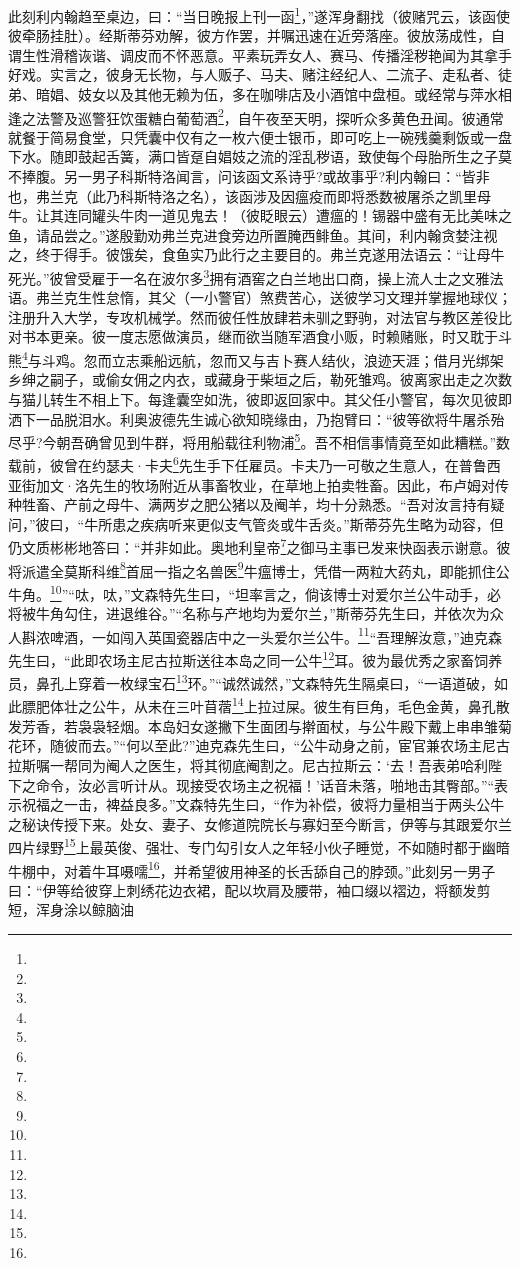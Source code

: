 \par 此刻利内翰趋至桌边，曰：“当日晚报上刊一函\footnote{}，”遂浑身翻找（彼赌咒云，该函使彼牵肠挂肚）。经斯蒂芬劝解，彼方作罢，并嘱迅速在近旁落座。彼放荡成性，自谓生性滑稽诙谐、调皮而不怀恶意。平素玩弄女人、赛马、传播淫秽艳闻为其拿手好戏。实言之，彼身无长物，与人贩子、马夫、赌注经纪人、二流子、走私者、徒弟、暗娼、妓女以及其他无赖为伍，多在咖啡店及小酒馆中盘桓。或经常与萍水相逢之法警及巡警狂饮蛋糖白葡萄酒\footnote{}，自午夜至天明，探听众多黄色丑闻。彼通常就餐于简易食堂，只凭囊中仅有之一枚六便士银币，即可吃上一碗残羹剩饭或一盘下水。随即鼓起舌簧，满口皆趸自娼妓之流的淫乱秽语，致使每个母胎所生之子莫不捧腹。另一男子科斯特洛闻言，问该函文系诗乎?或故事乎?利内翰曰：“皆非也，弗兰克（此乃科斯特洛之名），该函涉及因瘟疫而即将悉数被屠杀之凯里母牛。让其连同罐头牛肉一道见鬼去！（彼眨眼云）遭瘟的！锡器中盛有无比美味之鱼，请品尝之。”遂殷勤劝弗兰克进食旁边所置腌西鲱鱼。其间，利内翰贪婪注视之，终于得手。彼饿矣，食鱼实乃此行之主要目的。弗兰克遂用法语云：“让母牛死光。”彼曾受雇于一名在波尔多\footnote{}拥有酒窖之白兰地出口商，操上流人士之文雅法语。弗兰克生性怠惰，其父（一小警官）煞费苦心，送彼学习文理并掌握地球仪；注册升入大学，专攻机械学。然而彼任性放肆若未驯之野驹，对法官与教区差役比对书本更亲。彼一度志愿做演员，继而欲当随军酒食小贩，时赖赌账，时又耽于斗熊\footnote{}与斗鸡。忽而立志乘船远航，忽而又与吉卜赛人结伙，浪迹天涯；借月光绑架乡绅之嗣子，或偷女佣之内衣，或藏身于柴垣之后，勒死雏鸡。彼离家出走之次数与猫儿转生不相上下。每逢囊空如洗，彼即返回家中。其父任小警官，每次见彼即洒下一品脱泪水。利奥波德先生诚心欲知晓缘由，乃抱臂曰：“彼等欲将牛屠杀殆尽乎?今朝吾确曾见到牛群，将用船载往利物浦\footnote{}。吾不相信事情竟至如此糟糕。”数载前，彼曾在约瑟夫·卡夫\footnote{}先生手下任雇员。卡夫乃一可敬之生意人，在普鲁西亚街加文·洛先生的牧场附近从事畜牧业，在草地上拍卖牲畜。因此，布卢姆对传种牲畜、产前之母牛、满两岁之肥公猪以及阉羊，均十分熟悉。“吾对汝言持有疑问，”彼曰，“牛所患之疾病听来更似支气管炎或牛舌炎。”斯蒂芬先生略为动容，但仍文质彬彬地答曰：“并非如此。奥地利皇帝\footnote{}之御马主事已发来快函表示谢意。彼将派遣全莫斯科维\footnote{}首屈一指之名兽医\footnote{}牛瘟博士，凭借一两粒大药丸，即能抓住公牛角。\footnote{}”“呔，呔，”文森特先生曰，“坦率言之，倘该博士对爱尔兰公牛动手，必将被牛角勾住，进退维谷。”“名称与产地均为爱尔兰，”斯蒂芬先生曰，并依次为众人斟浓啤酒，一如闯入英国瓷器店中之一头爱尔兰公牛。\footnote{}“吾理解汝意，”迪克森先生曰，“此即农场主尼古拉斯送往本岛之同一公牛\footnote{}耳。彼为最优秀之家畜饲养员，鼻孔上穿着一枚绿宝石\footnote{}环。”“诚然诚然，”文森特先生隔桌曰，“一语道破，如此膘肥体壮之公牛，从未在三叶苜蓿\footnote{}上拉过屎。彼生有巨角，毛色金黄，鼻孔散发芳香，若袅袅轻烟。本岛妇女遂撇下生面团与擀面杖，与公牛殿下戴上串串雏菊花环，随彼而去。”“何以至此?”迪克森先生曰，“公牛动身之前，宦官兼农场主尼古拉斯嘱一帮同为阉人之医生，将其彻底阉割之。尼古拉斯云：‘去！吾表弟哈利陛下之命令，汝必言听计从。现接受农场主之祝福！’话音未落，啪地击其臀部。”“表示祝福之一击，裨益良多。”文森特先生曰，“作为补偿，彼将力量相当于两头公牛之秘诀传授下来。处女、妻子、女修道院院长与寡妇至今断言，伊等与其跟爱尔兰四片绿野\footnote{}上最英俊、强壮、专门勾引女人之年轻小伙子睡觉，不如随时都于幽暗牛棚中，对着牛耳嗫嚅\footnote{}，并希望彼用神圣的长舌舔自己的脖颈。”此刻另一男子曰：“伊等给彼穿上刺绣花边衣裙，配以坎肩及腰带，袖口缀以褶边，将额发剪短，浑身涂以鲸脑油\footnot